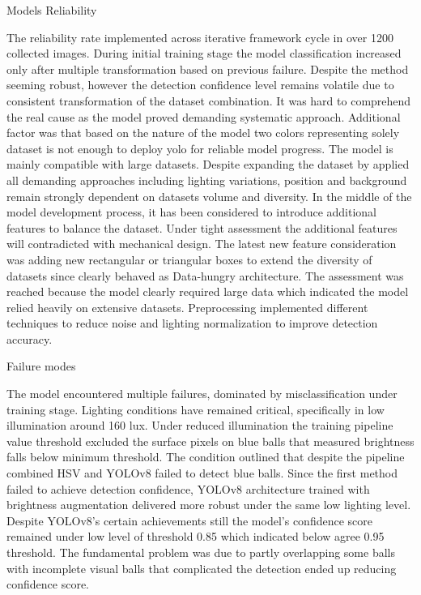  Models Reliability

The reliability rate implemented across iterative framework cycle in over 1200 collected images. During initial training stage the model classification increased only after multiple transformation based on previous failure. Despite the method seeming robust, however the detection confidence level remains volatile due to consistent transformation of the dataset combination. It was hard to comprehend the real cause as the model proved demanding systematic approach. Additional factor was that based on the nature of the model two colors representing solely dataset is not enough to deploy yolo for reliable model progress. The model is mainly compatible with large datasets. Despite expanding the dataset by applied all demanding approaches including lighting variations, position and background remain strongly dependent on datasets volume and diversity. In the middle of the model development process, it has been considered to introduce additional features to balance the dataset. Under tight assessment the additional features will contradicted with mechanical design. The latest new feature consideration was adding new rectangular or triangular boxes to extend the diversity of datasets since clearly behaved as Data-hungry architecture. The assessment was reached because the model clearly required large data which indicated the model relied heavily on extensive datasets. Preprocessing implemented different techniques to reduce noise and lighting normalization to improve detection accuracy.

Failure modes 

The model encountered multiple failures, dominated by misclassification under training stage. Lighting conditions have remained critical, specifically in low illumination around 160 lux. Under reduced illumination the training pipeline value threshold excluded the surface pixels on blue balls that measured brightness falls below minimum threshold. The condition outlined that despite the pipeline combined HSV and YOLOv8 failed to detect blue balls. Since the first method failed to achieve detection confidence, YOLOv8 architecture trained with brightness augmentation delivered more robust under the same low lighting level. Despite YOLOv8’s certain achievements still the model’s confidence score remained under low level of threshold 0.85 which indicated below agree 0.95 threshold. The fundamental problem was due to partly overlapping some balls with incomplete visual balls that complicated the detection ended up reducing confidence score.


